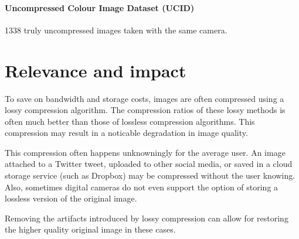 \paragraph{Uncompressed Colour Image Dataset (UCID) \cite{ucid}} 1338 truly uncompressed images taken with the same camera.

\section{Relevance and impact}{}

To save on bandwidth and storage costs, images are often compressed using a lossy compression algorithm. The compression ratios of these lossy methods is often much better than those of lossless compression algorithms. This compression may result in a noticable degradation in image quality.

This compression often happens unknowningly for the average user. An image attached to a Twitter tweet, uploaded to other social media, or saved in a cloud storage service (such as Dropbox) may be compressed without the user knowing. Also, sometimes digital cameras do not even support the option of storing a lossless version of the original image. 

Removing the artifacts introduced by lossy compression can allow for restoring the higher quality original image in these cases.